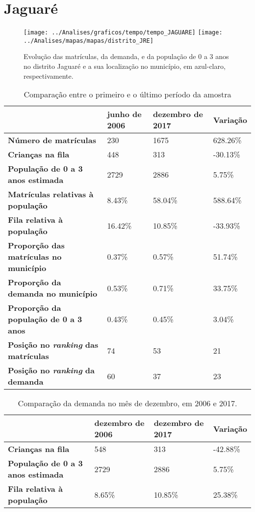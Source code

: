 \section{Jaguaré}
\begin{figure}[H]
\centering
\texttt{[image: ../Analises/graficos/tempo/tempo\_JAGUARE]}
\texttt{[image: ../Analises/mapas/mapas/distrito\_JRE]}
\caption{Evolução das matrículas, da demanda, e da população de 0 a 3 anos no distrito Jaguaré e a sua localização no município, em azul-claro, respectivamente.}
\end{figure}
\begin{table}[H]
\begin{tabular}{l|l|l|l}
\textbf{}                                      & \textbf{junho de 2006}       & \textbf{dezembro de 2017}    & \textbf{Variação} \\ \hline
\textbf{Número de matrículas}                  & 230 & 1675 & 628.26\% \\ \hline
\textbf{Crianças na fila}                      & 448 & 313 & -30.13\% \\ \hline
\textbf{População de 0 a 3 anos estimada}      & 2729 & 2886 & 5.75\% \\ \hline
\textbf{Matrículas relativas à população}      & 8.43\% & 58.04\% & 588.64\% \\ \hline
\textbf{Fila relativa à população}             & 16.42\% & 10.85\% & -33.93\% \\ \hline
\textbf{Proporção das matrículas no município} & 0.37\% & 0.57\% & 51.74\% \\ \hline
\textbf{Proporção da demanda no município}     & 0.53\% & 0.71\% & 33.75\% \\ \hline
\textbf{Proporção da população de 0 a 3 anos}  & 0.43\% & 0.45\% & 3.04\% \\ \hline
\textbf{Posição no \textit{ranking} das matrículas}     & 74 & 53 & 21 \\ \hline
\textbf{Posição no \textit{ranking} da demanda}         & 60 & 37 & 23 \\ 
\end{tabular}
\caption{Comparação entre o primeiro e o último período da amostra}
\end{table}
\begin{table}[H]
\begin{tabular}{l|l|l|l}
\textbf{}                                 & \textbf{dezembro de 2006} & \textbf{dezembro de 2017} & \textbf{Variação} \\ \hline
\textbf{Crianças na fila}                      & 548 & 313 & -42.88\% \\ \hline
\textbf{População de 0 a 3 anos estimada}      & 2729 & 2886 & 5.75\% \\ \hline
\textbf{Fila relativa à população}             & 8.65\% & 10.85\% & 25.38\% \\
\end{tabular}
\caption{Comparação da demanda no mês de dezembro, em 2006 e 2017.}
\end{table}

